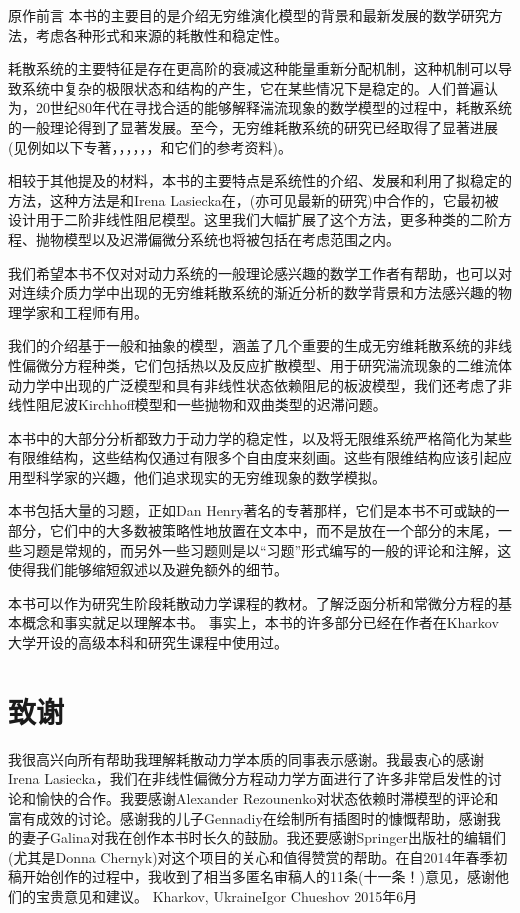 \begin{PreChapter}{原作前言}
	本书的主要目的是介绍无穷维演化模型的背景和最新发展的数学研究方法，考虑各种形式和来源的耗散性和稳定性。
	
	耗散系统的主要特征是存在更高阶的衰减这种能量重新分配机制，这种机制可以导致系统中复杂的极限状态和结构的产生，它在某些情况下是稳定的。人们普遍认为，20世纪80年代在寻找合适的能够解释湍流现象的数学模型的过程中，耗散系统的一般理论得到了显著发展。至今，无穷维耗散系统的研究已经取得了显著进展(见例如以下专著\cite{Babin92}，\cite{Chepyzhov02}，\cite{Hale88}，\cite{Ladyzhenskaya91}，\cite{Robinson01}，\cite{Sell02}，\cite{Temam97}和它们的参考资料)。
	
	相较于其他提及的材料，本书的主要特点是系统性的介绍、发展和利用了拟稳定的方法，这种方法是和Irena Lasiecka在\cite{Chueshov08}，\cite{Chueshov10}(亦可见最新的研究\cite{Chueshov13})中合作的，它最初被设计用于二阶非线性阻尼模型。这里我们大幅扩展了这个方法，更多种类的二阶方程、抛物模型以及迟滞偏微分系统也将被包括在考虑范围之内。
	
	我们希望本书不仅对对动力系统的一般理论感兴趣的数学工作者有帮助，也可以对对连续介质力学中出现的无穷维耗散系统的渐近分析的数学背景和方法感兴趣的物理学家和工程师有用。
	
	我们的介绍基于一般和抽象的模型，涵盖了几个重要的生成无穷维耗散系统的非线性偏微分方程种类，它们包括热以及反应扩散模型、用于研究湍流现象的二维流体动力学中出现的广泛模型和具有非线性状态依赖阻尼的板波模型，我们还考虑了非线性阻尼波Kirchhoff模型和一些抛物和双曲类型的迟滞问题。
	
	本书中的大部分分析都致力于动力学的稳定性，以及将无限维系统严格简化为某些有限维结构，这些结构仅通过有限多个自由度来刻画。这些有限维结构应该引起应用型科学家的兴趣，他们追求现实的无穷维现象的数学模拟。
	
	本书包括大量的习题，正如Dan Henry著名的专著\cite{Henry81}那样，它们是本书不可或缺的一部分，它们中的大多数被策略性地放置在文本中，而不是放在一个部分的末尾，一些习题是常规的，而另外一些习题则是以“习题”形式编写的一般的评论和注解，这使得我们能够缩短叙述以及避免额外的细节。
	
	本书可以作为研究生阶段耗散动力学课程的教材。了解泛函分析和常微分方程的基本概念和事实就足以理解本书。 事实上，本书的许多部分已经在作者在Kharkov大学开设的高级本科和研究生课程中使用过。

	\section*{致谢}

	我很高兴向所有帮助我理解耗散动力学本质的同事表示感谢。我最衷心的感谢Irena Lasiecka，我们在非线性偏微分方程动力学方面进行了许多非常启发性的讨论和愉快的合作。我要感谢Alexander Rezounenko对状态依赖时滞模型的评论和富有成效的讨论。感谢我的儿子Gennadiy在绘制所有插图时的慷慨帮助，感谢我的妻子Galina对我在创作本书时长久的鼓励。我还要感谢Springer出版社的编辑们(尤其是Donna Chernyk)对这个项目的关心和值得赞赏的帮助。在自2014年春季初稿开始创作的过程中，我收到了相当多匿名审稿人的11条(十一条！)意见，感谢他们的宝贵意见和建议。
	\newline\newline
	Kharkov, Ukraine\hfill Igor Chueshov
	\newline
	2015年6月
\end{PreChapter}	
	
	